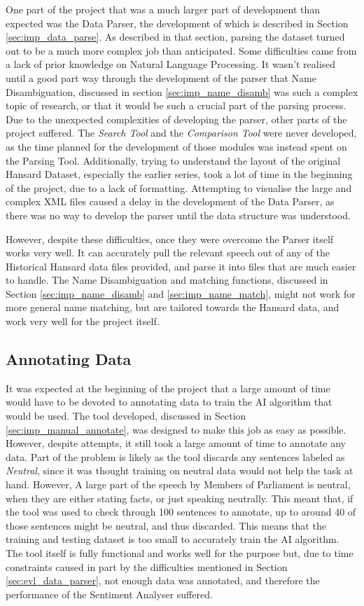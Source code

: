 One part of the project that was a much larger part of development than expected was the Data Parser, the development of which is described in Section \ref{sec:imp_data_parse}. As described in that section, parsing the dataset turned out to be a much more complex job than anticipated. Some difficulties came from a lack of prior knowledge on Natural Language Processing. It wasn't realised until a good part way through the development of the parser that Name Disambiguation, discussed in section \ref{sec:imp_name_disamb} was such a complex topic of research, or that it would be such a crucial part of the parsing process. Due to the unexpected complexities of developing the parser, other parts of the project suffered. The \emph{Search Tool} and the \emph{Comparison Tool} were never developed, as the time planned for the development of those modules was instead spent on the Parsing Tool. Additionally, trying to understand the layout of the original Hansard Dataset, especially the earlier series, took a lot of time in the beginning of the project, due to a lack of formatting. Attempting to visualise the large and complex XML files caused a delay in the development of the Data Parser, as there was no way to develop the parser until the data structure was understood.

However, despite these difficulties, once they were overcome the Parser itself works very well. It can accurately pull the relevant speech out of any of the Historical Hansard data files provided, and parse it into files that are much easier to handle. The Name Disambiguation and matching functions, discussed in Section \ref{sec:imp_name_disamb} and \ref{sec:imp_name_match}, might not work for more general name matching, but are tailored towards the Hansard data, and work very well for the project itself.

\subsection{Annotating Data}
\label{sec:evl_annotate_data}

It was expected at the beginning of the project that a large amount of time would have to be devoted to annotating data to train the AI algorithm that would be used. The tool developed, discussed in Section \ref{sec:imp_manual_annotate}, was designed to make this job as easy as possible. However, despite attempts, it still took a large amount of time to annotate any data. Part of the problem is likely as the tool discards any sentences labeled as \emph{Neutral}, since it was thought training on neutral data would not help the task at hand. However, A large part of the speech by Members of Parliament is neutral, when they are either stating facts, or just speaking neutrally. This meant that, if the tool was used to check through 100 sentences to annotate, up to around 40 of those sentences might be neutral, and thus discarded. This means that the training and testing dataset is too small to accurately train the AI algorithm. The tool itself is fully functional and works well for the purpose but, due to time constraints caused in part by the difficulties mentioned in Section \ref{sec:evl_data_parser}, not enough data was annotated, and therefore the performance of the Sentiment Analyser suffered.

